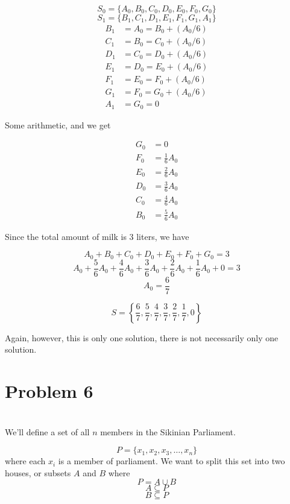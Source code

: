 \documentclass[12pt]{article}
\begin{document}
\[S_0 = \{A_0, B_0, C_0, D_0, E_0, F_0, G_0\}\]
\[S_1 = \{B_1, C_1, D_1, E_1, F_1, G_1, A_1\}\]
\begin{align*}
    B_1 &= A_0 = B_0 + (A_0/6) \\
    C_1 &= B_0 = C_0 + (A_0/6) \\
    D_1 &= C_0 = D_0 + (A_0/6) \\
    E_1 &= D_0 = E_0 + (A_0/6) \\
    F_1 &= E_0 = F_0 + (A_0/6) \\
    G_1 &= F_0 = G_0 + (A_0/6) \\
    A_1 &= G_0 = 0
\end{align*}

Some arithmetic, and we get

\begin{align*}
    G_0 &= 0 \\
    F_0 &= \frac{1}{6} A_0 \\
    E_0 &= \frac{2}{6} A_0 \\
    D_0 &= \frac{3}{6} A_0 \\
    C_0 &= \frac{4}{6} A_0 \\
    B_0 &= \frac{5}{6} A_0
\end{align*}

Since the total amount of milk is 3 liters, we have

\[A_0 + B_0 + C_0 + D_0 + E_0 + F_0 + G_0 = 3\] 
\[A_0 + \frac{5}{6} A_0 + \frac{4}{6} A_0 + \frac{3}{6} A_0 + \frac{2}{6} A_0 + \frac{1}{6} A_0 + 0 = 3\]
\[A_0 = \frac{6}{7}\]

\[S = \left\{\frac{6}{7}, \frac{5}{7}, \frac{4}{7}, \frac{3}{7}, \frac{2}{7}, \frac{1}{7}, 0\right\}\]

Again, however, this is only one solution, there is not necessarily only one solution.


\section*{Problem 6}
\\

We'll define a set of all $n$ members in the Sikinian Parliament.

\[P = \{x_1, x_2, x_3, \dots, x_n\}\]
where each $x_i$ is a member of parliament. We want to split this set into two houses, or subsets $A$ and $B$ where
\[P = A \cup B\]
\[A \subseteq P\]
\[B \subseteq P\]
\end{document}
